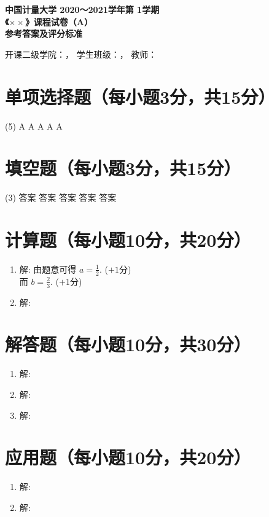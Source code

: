 \documentclass[AutoFakeBold=2.85]{article}
\def\Year{2020～2021}       %
\def\Semester{1}            %
\def\Course{$\times\times$} %
\def\Type{A}                %
\def\School{$\times\times$} %
\def\Class{}                %
\def\Teacher{}              %
\renewcommand{\maketitle}{\bgroup
  \parindent0pt\linespread{1.5}\zihao{-4}%
  \begin{center}
    \zihao{4}\bfseries\fangsong
    中国计量大学 \Year 学年第 \Semester 学期\\
    《\Course》课程试卷（\Type）\\
    参考答案及评分标准
  \end{center}%
  开课二级学院：\underline{\makebox[8em][c]{\School}}，
  学生班级：\underline{\makebox[6em][c]{\Class}}，
  教师：\underline{\makebox[6em][c]{\Teacher}}
\egroup}
\begin{document}
\maketitle

\section{单项选择题（每小题3分，共15分）}

\begin{tasks}(5)
  \task A
  \task A
  \task A
  \task A
  \task A
\end{tasks}

\section{填空题（每小题3分，共15分）}

\begin{tasks}(3)
  \task 答案
  \task 答案
  \task 答案
  \task 答案
  \task 答案
\end{tasks}

\section{计算题（每小题10分，共20分）}

\begin{enumerate}
  \item 解:
    由题意可得 $\displaystyle a=\frac12$.
    \dotfill ($+1$分)\\
    而 $\displaystyle b=\frac23$.
    \dotfill ($+1$分)
  \item 解:
\end{enumerate}

\section{解答题（每小题10分，共30分）}

\begin{enumerate}
  \item 解:
  \item 解:
  \item 解:
\end{enumerate}

\section{应用题（每小题10分，共20分）}

\begin{enumerate}
  \item 解:
  \item 解:
\end{enumerate}
\end{document}
